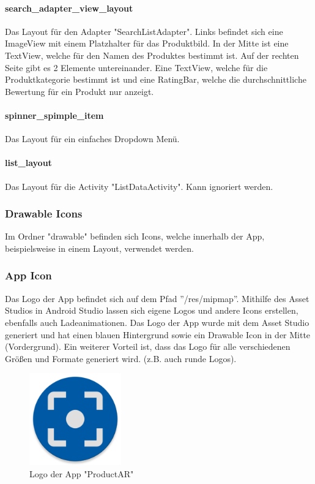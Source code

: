 \documentclass{scrartcl}
\begin{document}
\paragraph{search\_adapter\_view\_layout} \mbox{} 

\noindent Das Layout für den Adapter "SearchListAdapter". Links befindet sich eine ImageView mit einem Platzhalter für das Produktbild. In der Mitte ist eine TextView, welche für den Namen des Produktes bestimmt ist. Auf der rechten Seite gibt es 2 Elemente untereinander. Eine TextView, welche für die Produktkategorie bestimmt ist und eine RatingBar, welche die durchschnittliche Bewertung für ein Produkt nur anzeigt.

\paragraph{spinner\_spimple\_item} \mbox{} 

\noindent Das Layout für ein einfaches Dropdown Menü. 

\paragraph{list\_layout} \mbox{} 

\noindent Das Layout für die Activity "ListDataActivity". Kann ignoriert werden.

\subsubsection{Drawable Icons}

Im Ordner "drawable" befinden sich Icons, welche innerhalb der App, beispielsweise in einem Layout, verwendet werden.

\newpage

\subsubsection{App Icon}

Das Logo der App befindet sich auf dem Pfad ''/res/mipmap''. Mithilfe des Asset Studios in Android Studio lassen sich eigene Logos und andere Icons erstellen, ebenfalls auch Ladeanimationen. Das Logo der App wurde mit dem Asset Studio generiert und hat einen blauen Hintergrund sowie ein Drawable Icon in der Mitte (Vordergrund). Ein weiterer Vorteil ist, dass das Logo für alle verschiedenen Größen und Formate generiert wird. (z.B. auch runde Logos).

\begin{figure}[h]
\centering
\includegraphics[width=150px]{img/app_icon.png}
\caption{Logo der App "ProductAR"}
\end{figure}
\end{document}
